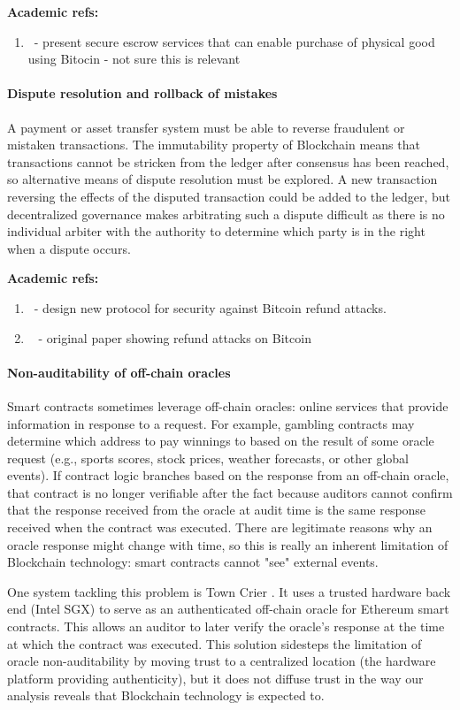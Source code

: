 \noindent
\textbf{Academic refs:}
\begin{enumerate}
\item~\cite{FC:GBGN17}- present secure escrow services that can enable purchase of physical good using Bitocin - not sure this is relevant
\end{enumerate}

\paragraph{Dispute resolution and rollback of mistakes}
A payment or asset transfer system must be able to reverse fraudulent or mistaken transactions. The immutability property of Blockchain means that transactions cannot be stricken from the ledger after consensus has been reached, so alternative means of dispute resolution must be explored. A new transaction reversing the effects of the disputed transaction could be added to the ledger, but decentralized governance makes arbitrating such a dispute difficult as there is no individual arbiter with the authority to determine which party is in the right when a dispute occurs. 

\noindent
\textbf{Academic refs:}
\begin{enumerate}
\item ~\cite{arxiv:AviSafSha18}- design new protocol for security against Bitcoin refund attacks.
\item ~\cite{FC:MccShaHao16} - original paper showing refund attacks on Bitcoin
\end{enumerate}

\paragraph{Non-auditability of off-chain oracles}
Smart contracts sometimes leverage off-chain oracles: online services that provide information in response to a request. For example, gambling contracts may determine which address to pay winnings to based on the result of some oracle request (e.g., sports scores, stock prices, weather forecasts, or other global events). If contract logic branches based on the response from an off-chain oracle, that contract is no longer verifiable after the fact because auditors cannot confirm that the response received from the oracle at audit time is the same response received when the contract was executed. There are legitimate reasons why an oracle response might change with time, so this is really an inherent limitation of Blockchain technology: smart contracts cannot "see" external events.

One system tackling this problem is Town Crier \cite{Zhang16}. It uses a trusted hardware back end (Intel SGX) to serve as an authenticated off-chain oracle for Ethereum smart contracts. This allows an auditor to later verify the oracle's response at the time at which the contract was executed. This solution sidesteps the limitation of oracle non-auditability by moving trust to a centralized location (the hardware platform providing authenticity), but it does not diffuse trust in the way our analysis reveals that Blockchain technology is expected to.



